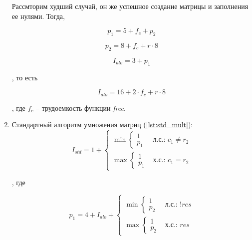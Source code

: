 \begin{enumerate}
    Рассмторим худший случай,
    он же успешное создание матрицы и
    заполнения ее нулями. Тогда,

    \begin{equation*}
        p_1 = 5 + f_c + p_2
    \end{equation*}

    \begin{equation*}
        p_2 = 8 + f_c + r \cdot 8
    \end{equation*}

    \begin{equation*}
        I_{alo} = 3 + p_1
    \end{equation*}

    , то есть

    \begin{equation*}
        I_{alo} = 16 + 2 \cdot f_c + r \cdot 8
    \end{equation*}

    , где \( f_c \) -- трудоемкость функции \textit{free}.

    \item Стандартный алгоритм умножения матриц (\ref{lst:std_mult}):
    \begin{equation*}
        I_{std} = 
        1 +
        \begin{cases}
            \min
            \begin{cases}
                1 \\
                p_1
            \end{cases} & \textit{л.с.: $c_1 \ne r_2$} \\
            \max
            \begin{cases}
                1 \\
                p_1
            \end{cases} & \textit{х.с.: $c_1 = r_2$}
        \end{cases}
    \end{equation*}

    , где
    
    \begin{equation*}
        p_1 =
        4 + I_{alo} +
        \begin{cases}
            \min
            \begin{cases}
                1 \\
                p_2
            \end{cases} & \textit{л.с.: !res} \\
            \max
            \begin{cases}
                1 \\
                p_2
            \end{cases} & \textit{х.с.: res}
        \end{cases}
    \end{equation*}


\end{enumerate}
